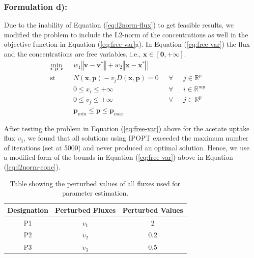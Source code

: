 \documentclass[10pt]{report}
\begin{document}
	\subsubsection{Formulation d):}
	Due to the inability of Equation (\ref{eq:l2norm-flux}) to get feasible results, we modified the problem to include the L2-norm of the concentrations as well in the objective function in Equation (\ref{eq:free-var}a). In Equation (\ref{eq:free-var}) the flux and the concentrations are free variables, i.e.,  $\mathbf{x}\in\left[\mathbf{0},+\mathbf{\infty}\right]$. 
	\begin{subequations}\label{eq:free-var}
		\begin{align}
		\underset{\mathbf{x},\mathbf{p},\mathbf{v}}{\mathrm{min}} & \text{      }w_1\left\Vert \mathbf{v}-\mathbf{v}^*\right\Vert + w_2\left\Vert \mathbf{x}-\mathbf{x}^*\right\Vert\\
		\mathrm{st}& \text{      }N(\mathbf{x},\mathbf{p}) - v_jD(\mathbf{x},\mathbf{p}) = 0 & \text{  }\forall & \text{ }j\in\mathbb{R}^p\\
		& \text{      }0\le x_i \le +\infty & \text{  }\forall & \text{ }i\in\mathbb{R}^{mp}\\	
		& \text{      }0\le v_j \le +\infty & \text{  }\forall & \text{ }j\in\mathbb{R}^{p}\\		
		& \text{      }\mathbf{p}_{min} \le \mathbf{p} \le \mathbf{p}_{max}
		\end{align}
	\end{subequations}

After testing the problem in Equation (\ref{eq:free-var}) above for the acetate uptake flux $v_1$, we found that all solutions using IPOPT exceeded the maximum number of iterations (set at 5000) and never produced an optimal solution. Hence, we use a modified form of the bounds in Equation (\ref{eq:free-var}) above in Equation (\ref{eq:l2norm-conc}).

	\begin{table}[!tbhp]
		\caption{Table showing the perturbed values of all fluxes used for parameter estimation.}
		\begin{center}				
			\begin{tabular}{ccc}
				Designation & Perturbed Fluxes & Perturbed Values\\
				\hline
				P1 & $v_1$ & 2\\
				P2 & $v_2$ & 0.2\\
				P3 & $v_3$ & 0.5
			\end{tabular}
		\end{center}	
		\label{tab:pval}
	\end{table}
\end{document}
